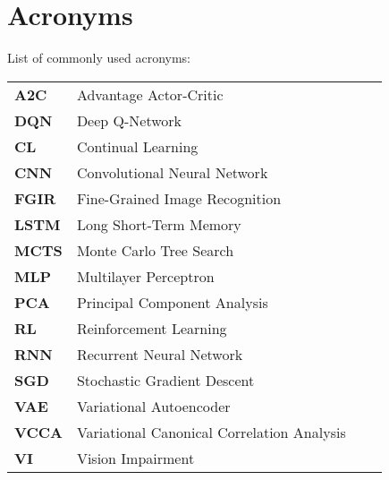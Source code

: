
\chapter{Acronyms}
\label{chap:acronyms}

List of commonly used acronyms: \\

\begin{tabular}{llll}
	\textbf{A2C}		& 	Advantage Actor-Critic \\
	\textbf{DQN}		& 	Deep Q-Network \\
	\textbf{CL}			& 	Continual Learning \\
	\textbf{CNN}		& 	Convolutional Neural Network \\
	\textbf{FGIR}		& 	Fine-Grained Image Recognition \\
	\textbf{LSTM}       &   Long Short-Term Memory \\
	\textbf{MCTS}       &   Monte Carlo Tree Search \\
	\textbf{MLP}        &   Multilayer Perceptron \\
	\textbf{PCA}		& 	Principal Component Analysis \\
	\textbf{RL}			& 	Reinforcement Learning \\
	\textbf{RNN}		& 	Recurrent Neural Network \\
	\textbf{SGD}		& 	Stochastic Gradient Descent \\
	\textbf{VAE}		&	Variational Autoencoder \\
	\textbf{VCCA}		&	Variational Canonical Correlation Analysis \\
	\textbf{VI} 		&	Vision Impairment \\
\end{tabular}